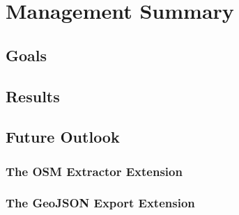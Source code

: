 \chapter*{Management Summary}
\lipsum[2-3]
\section*{Goals}
\lipsum[4-6]
\section*{Results}
\lipsum[6-7]
\section*{Future Outlook}
\subsection*{The OSM Extractor Extension}
\lipsum[8-9]
\subsection*{The GeoJSON Export Extension}
\lipsum[10-11]